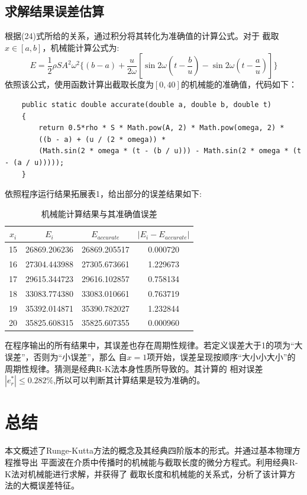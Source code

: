 \documentclass[lang=cn,a4paper,newtx]{elegantpaper}
\begin{document}
 \subsection{求解结果误差估算}
 根据(24)式所给的关系，通过积分将其转化为准确值的计算公式。对于
  截取$x\in[a,b]$，机械能计算公式为:
  \begin{equation}
    E=\frac{1}{2}\rho SA^2 \omega^2\{(b-a)+\frac{u}{2\omega}[\sin 2\omega(t-\frac{b}{u})-\sin 2\omega(t-\frac{a}{u})]\}
  \end{equation}
  依照该公式，使用函数计算出截取长度为$[0,40]$的机械能的准确值，代码如下：
\newpage
  \begin{lstlisting}
    public static double accurate(double a, double b, double t)
    {
        return 0.5*rho * S * Math.pow(A, 2) * Math.pow(omega, 2) * 
        ((b - a) + (u / (2 * omega)) * 
        (Math.sin(2 * omega * (t - (b / u))) - Math.sin(2 * omega * (t - (a / u)))));
    }
  \end{lstlisting}
依照程序运行结果拓展表1，给出部分的误差结果如下:
  \begin{table}[ht]
    \centering
    \begin{tabular}{|c|c|c|c|}
    \hline
        $x_i$ & $E_i$ & $E_{accurate}$ & $|E_i-E_{accurate}|$\\ \hline
        15 & 26869.206236 & 26869.205517 & 0.000720\\ \hline
        16 & 27304.443988 & 27305.673661 & 1.229673\\ \hline
        17 & 29615.344723 & 29616.102857 & 0.758134\\ \hline
        18 & 33083.774380 & 33083.010661 & 0.763719\\ \hline
        19 & 35392.014871 & 35390.782027 & 1.232844\\ \hline
        20 & 35825.608315 & 35825.607355 & 0.000960\\ \hline
    \end{tabular}
    \caption{机械能计算结果与其准确值误差}
  \end{table}

在程序输出的所有结果中，其误差也存在周期性规律。若定义误差大于1的项为“大误差”，否则为“小误差”，那么
自$x=1$项开始，误差呈现按顺序“大小小大小”的周期性规律。猜测是经典R-K法本身性质所导致的。其计算的
相对误差$|e_r^*| \leqslant 0.282\%$,所以可以判断其计算结果是较为准确的。

\section*{总结}
  本文概述了Runge-Kutta方法的概念及其经典四阶版本的形式。并通过基本物理方程推导出
  平面波在介质中传播时的机械能与截取长度的微分方程式。利用经典R-K法对机械能进行求解，并获得了
  截取长度和机械能的关系式，分析了该计算方法的大概误差特征。
\end{document}
